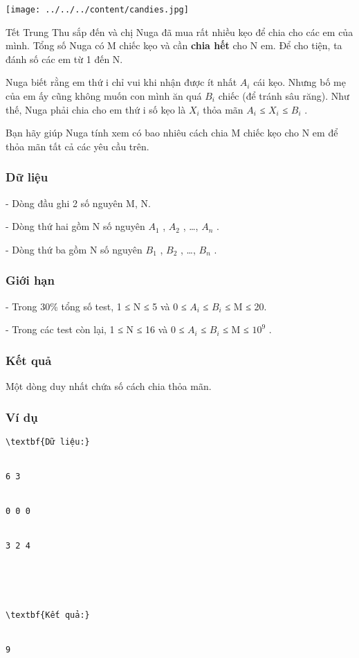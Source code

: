 








\texttt{[image: ../../../content/candies.jpg]}

   Tết Trung Thu sắp đến và chị Nuga đã mua rất nhiều kẹo để chia cho các em của mình. Tổng số Nuga có M chiếc kẹo và cần   \textbf{    chia hết   }   cho N em. Để cho tiện, ta đánh số các em từ 1 đến N.  

   Nuga biết rằng em thứ i chỉ vui khi nhận được ít nhất $A_{i}$   cái kẹo. Nhưng bố mẹ của em ấy cũng không muốn con mình ăn quá $B_{i}$   chiếc (để tránh sâu răng). Như thế, Nuga phải chia cho em thứ i số kẹo là $X_{i}$   thỏa mãn $A_{i}$   ≤ $X_{i}$   ≤ $B_{­i}$   .  

   Bạn hãy giúp Nuga tính xem có bao nhiêu cách chia M chiếc kẹo cho N em để thỏa mãn tất cả các yêu cầu trên.  

\subsubsection{   Dữ liệu  }

   - Dòng đầu ghi 2 số nguyên M, N.  

   - Dòng thứ hai gồm N số nguyên $A_{1}$   , $A_{2}$   , …, $A_{n}$   .  

   - Dòng thứ ba gồm N số nguyên $B_{1}$   , $B_{2}$   , …, $B_{n}$   .  

\subsubsection{\textbf{    Giới hạn   }}

   - Trong 30\% tổng số test, 1 ≤ N ≤ 5 và 0 ≤ $A_{i}$   ≤ $B_{i}$   ≤ M ≤ 20.  

   - Trong các test còn lại, 1 ≤ N ≤ 16 và 0 ≤ $A_{i}$   ≤ $B_{i}$   ≤ M ≤ $10^{9}$   .  

\subsubsection{   Kết quả  }

   Một dòng duy nhất chứa số cách chia thỏa mãn.  

\subsubsection{   Ví dụ  }
\begin{verbatim}
\textbf{Dữ liệu:}


6 3


0 0 0


3 2 4





\textbf{Kết quả:}


9\end{verbatim}



